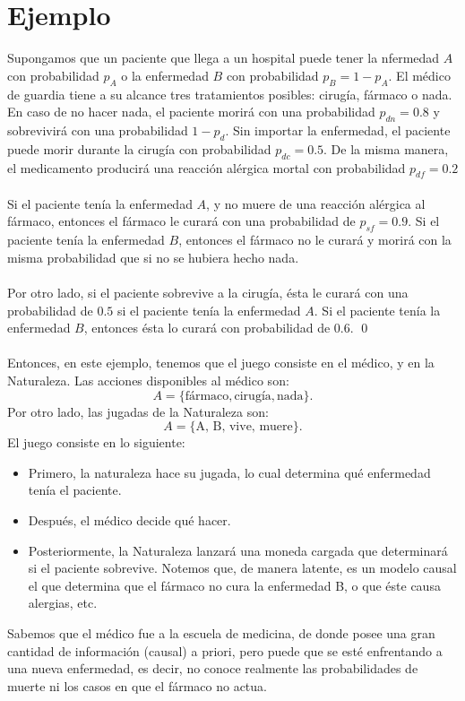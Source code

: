 \documentclass[11pt]{article}
\theoremstyle{plain}
\begin{document}
\section{Ejemplo}
Supongamos que un paciente que llega a un hospital puede tener la nfermedad $A$ con probabilidad $p_A$ o la enfermedad $B$ con probabilidad $p_B=1-p_A$. El médico de guardia tiene a su alcance tres tratamientos posibles: cirugía, fármaco o nada. En caso de no hacer nada, el paciente morirá con una probabilidad $p_{dn}=0.8$ y sobrevivirá con una probabilidad $1-p_d$. Sin importar la enfermedad, el paciente puede morir durante la cirugía con probabilidad $p_{dc}=0.5$. De la misma manera, el medicamento producirá una reacción alérgica mortal con probabilidad $p_{df}=0.2$\\
\\
\indent Si el paciente tenía la enfermedad $A$, y no muere de una reacción alérgica al fármaco, entonces el fármaco le curará con una probabilidad de $p_{sf}=0.9$. Si el paciente tenía la enfermedad $B$, entonces el fármaco no le curará y morirá con la misma probabilidad que si no se hubiera hecho nada.\\
\\
\indent Por otro lado, si el paciente sobrevive a la cirugía, ésta le curará con una probabilidad de $0.5$ si el paciente tenía la enfermedad $A$. Si el paciente tenía la enfermedad $B$, entonces ésta lo curará con probabilidad de $0.6$. \qed
\\
\\
\indent Entonces, en este ejemplo, tenemos que el juego consiste en el médico, y en la Naturaleza. Las acciones disponibles al médico son:
\[ A= \{ \textrm{fármaco},  \textrm{cirugía}, \textrm{nada} \}. \]
Por otro lado, las jugadas de la Naturaleza son: 
\[ A= \{ \textrm{A, B, vive, muere} \}. \] 
El juego consiste en lo siguiente:
\begin{itemize}
\item Primero, la naturaleza hace su jugada, lo cual determina qué enfermedad tenía el paciente. 
\item Después, el médico decide qué hacer. 
\item Posteriormente, la Naturaleza lanzará una moneda cargada que determinará si el paciente sobrevive. Notemos que, de manera latente, es un modelo causal el que determina que el fármaco no cura la enfermedad B, o que éste causa alergias, etc.
\end{itemize}
Sabemos que el médico fue a la escuela de medicina, de donde posee una gran cantidad de información (causal) a priori, pero puede que se esté enfrentando a una nueva enfermedad, es decir, no conoce realmente las probabilidades de muerte ni los casos en que el fármaco no actua.\\
\end{document}
